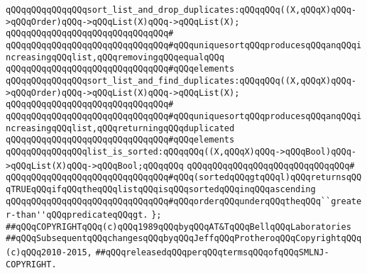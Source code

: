 \newline
\verb|qQQqqQQqqQQqqQQqsort_list_and_drop_duplicates:qQQqqQQq((X,qQQqX)qQQq->qQQqOrder)qQQq->qQQqList(X)qQQq->qQQqList(X);|\newline
\verb|qQQqqQQqqQQqqQQqqQQqqQQqqQQqqQQq#|\newline
\verb|qQQqqQQqqQQqqQQqqQQqqQQqqQQqqQQq#qQQquniquesortqQQqproducesqQQqanqQQqincreasingqQQqlist,qQQqremovingqQQqequalqQQq|\newline
\verb|qQQqqQQqqQQqqQQqqQQqqQQqqQQqqQQq#qQQqelements|\newline
\newline
\verb|qQQqqQQqqQQqqQQqsort_list_and_find_duplicates:qQQqqQQq((X,qQQqX)qQQq->qQQqOrder)qQQq->qQQqList(X)qQQq->qQQqList(X);|\newline
\verb|qQQqqQQqqQQqqQQqqQQqqQQqqQQqqQQq#|\newline
\verb|qQQqqQQqqQQqqQQqqQQqqQQqqQQqqQQq#qQQquniquesortqQQqproducesqQQqanqQQqincreasingqQQqlist,qQQqreturningqQQqduplicated|\newline
\verb|qQQqqQQqqQQqqQQqqQQqqQQqqQQqqQQq#qQQqelements|\newline
\newline
\verb|qQQqqQQqqQQqqQQqlist_is_sorted:qQQqqQQq((X,qQQqX)qQQq->qQQqBool)qQQq->qQQqList(X)qQQq->qQQqBool;qQQqqQQq|\newline
\verb|qQQqqQQqqQQqqQQqqQQqqQQqqQQqqQQq#|\newline
\verb|qQQqqQQqqQQqqQQqqQQqqQQqqQQqqQQq#qQQq(sortedqQQqgtqQQql)qQQqreturnsqQQqTRUEqQQqifqQQqtheqQQqlistqQQqisqQQqsortedqQQqinqQQqascending|\newline
\verb|qQQqqQQqqQQqqQQqqQQqqQQqqQQqqQQq#qQQqorderqQQqunderqQQqtheqQQq``greater-than''qQQqpredicateqQQqgt.|\newline
\verb|};|\newline
\newline
\newline
\verb|##qQQqCOPYRIGHTqQQq(c)qQQq1989qQQqbyqQQqAT&TqQQqBellqQQqLaboratories|\newline
\verb|##qQQqSubsequentqQQqchangesqQQqbyqQQqJeffqQQqProtheroqQQqCopyrightqQQq(c)qQQq2010-2015,|\newline
\verb|##qQQqreleasedqQQqperqQQqtermsqQQqofqQQqSMLNJ-COPYRIGHT.|\newline

